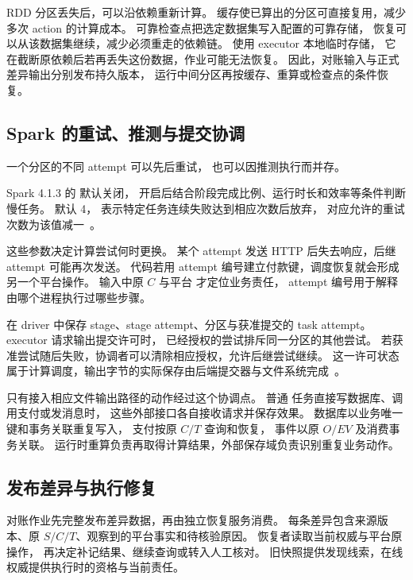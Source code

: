 RDD 分区丢失后，可以沿依赖重新计算。
缓存使已算出的分区可直接复用，减少多次 action 的计算成本。
可靠检查点把选定数据集写入配置的可靠存储，
恢复可以从该数据集继续，减少必须重走的依赖链。
 使用 executor 本地临时存储，
它在截断原依赖后若再丢失这份数据，作业可能无法恢复。
因此，对账输入与正式差异输出分别发布持久版本，
运行中间分区再按缓存、重算或检查点的条件恢复。

\subsection{Spark 的重试、推测与提交协调}

一个分区的不同 attempt 可以先后重试，
也可以因推测执行而并存。

Spark 4.1.3 的 \mbox{} 默认关闭，
开启后结合阶段完成比例、运行时长和效率等条件判断慢任务。
\mbox{} 默认 4，
表示特定任务连续失败达到相应次数后放弃，
对应允许的重试次数为该值减一~\cite{spark413-config}。

这些参数决定计算尝试何时更换。
某个 attempt 发送 HTTP 后失去响应，后继 attempt 可能再次发送。
代码若用 attempt 编号建立付款键，调度恢复就会形成另一个平台操作。
输入中原 $C$ 与平台  才定位业务责任，
attempt 编号用于解释由哪个进程执行过哪些步骤。

 在 driver 中保存
stage、stage attempt、分区与获准提交的 task attempt。
executor 请求输出提交许可时，
已经授权的尝试排斥同一分区的其他尝试。
若获准尝试随后失败，协调者可以清除相应授权，允许后继尝试继续。
这一许可状态属于计算调度，输出字节的实际保存由后端提交器与文件系统完成~\cite{spark413-commit}。


只有接入相应文件输出路径的动作经过这个协调点。
普通  任务直接写数据库、调用支付或发消息时，
这些外部接口各自接收请求并保存效果。
数据库以业务唯一键和事务关联重复写入，
支付按原 $C/T$ 查询和恢复，
事件以原 $O/EV$ 及消费事务关联。
运行时重算负责再取得计算结果，外部保存域负责识别重复业务动作。

\subsection{发布差异与执行修复}

对账作业先完整发布差异数据，再由独立恢复服务消费。
每条差异包含来源版本、原 $S/C/T$、观察到的平台事实和待核验原因。
恢复者读取当前权威与平台原操作，
再决定补记结果、继续查询或转入人工核对。
旧快照提供发现线索，在线权威提供执行时的资格与当前责任。

